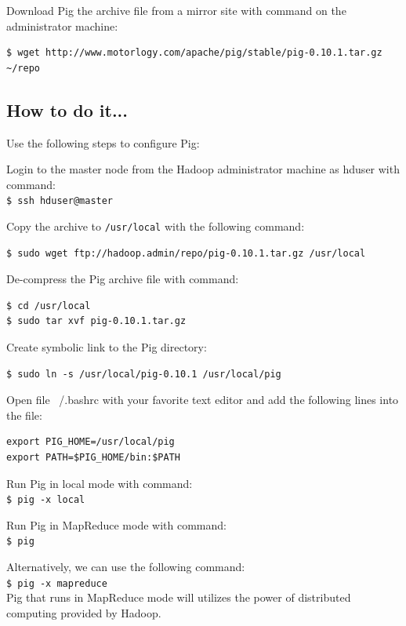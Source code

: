 Download Pig the archive file from a mirror site with command on the administrator machine:
\lstset{style=bashstyle}
\begin{lstlisting}
$ wget http://www.motorlogy.com/apache/pig/stable/pig-0.10.1.tar.gz ~/repo
\end{lstlisting}

\subsection*{How to do it...}
Use the following steps to configure Pig:

Login to the master node from the Hadoop administrator machine as hduser with command: \\
\verb|$ ssh hduser@master|

Copy the archive to \verb|/usr/local| with the following command: 
\lstset{style=bashstyle}
\begin{lstlisting}
$ sudo wget ftp://hadoop.admin/repo/pig-0.10.1.tar.gz /usr/local
\end{lstlisting}

De-compress the Pig archive file with command:
\lstset{style=bashstyle}
\begin{lstlisting}
$ cd /usr/local
$ sudo tar xvf pig-0.10.1.tar.gz
\end{lstlisting}

Create symbolic link to the Pig directory:
\lstset{style=bashstyle}
\begin{lstlisting}
$ sudo ln -s /usr/local/pig-0.10.1 /usr/local/pig
\end{lstlisting}

Open file ~/.bashrc with your favorite text editor and add the following lines into the file:
\lstset{style=bashstyle}
\begin{lstlisting}
export PIG_HOME=/usr/local/pig
export PATH=$PIG_HOME/bin:$PATH
\end{lstlisting}

Run Pig in local mode with command: \\
\verb|$ pig -x local|

Run Pig in MapReduce mode with command: \\
\verb|$ pig|

Alternatively, we can use the following command: \\
\verb|$ pig -x mapreduce| \\
Pig that runs in MapReduce mode will utilizes the power of distributed computing provided by Hadoop.

